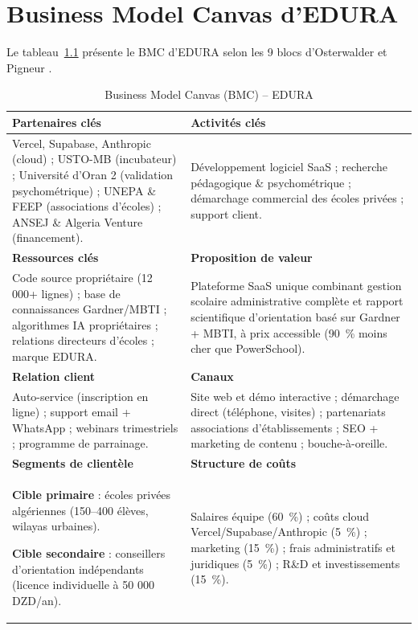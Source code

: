 \documentclass[12pt,a4paper,oneside]{report}
\begin{document}
\chapter{Business Model Canvas d'EDURA}

Le tableau~\ref{tab:bmc} présente le \ac{BMC} d'EDURA selon les 9 blocs d'Osterwalder et Pigneur \autocite{osterwalder2010business}.

\begin{table}[H]
\centering
\caption{Business Model Canvas (BMC) -- EDURA}
\label{tab:bmc}
\renewcommand{\arraystretch}{1.3}
\begin{tabularx}{\textwidth}{|X|X|}
\hline
\rowcolor{gray!20}
\textbf{Partenaires clés} & \textbf{Activités clés} \\
\hline
Vercel, Supabase, Anthropic (cloud) ; USTO-MB (incubateur) ; Université d'Oran 2 (validation psychométrique) ; UNEPA \& FEEP (associations d'écoles) ; ANSEJ \& Algeria Venture (financement).
&
Développement logiciel SaaS ; recherche pédagogique \& psychométrique ; démarchage commercial des écoles privées ; support client. \\
\hline
\rowcolor{gray!20}
\textbf{Ressources clés} & \textbf{Proposition de valeur} \\
\hline
Code source propriétaire (12 000+ lignes) ; base de connaissances Gardner/MBTI ; algorithmes IA propriétaires ; relations directeurs d'écoles ; marque EDURA.
&
Plateforme SaaS unique combinant gestion scolaire administrative complète et rapport scientifique d'orientation basé sur Gardner + MBTI, à prix accessible (90~\% moins cher que PowerSchool). \\
\hline
\rowcolor{gray!20}
\textbf{Relation client} & \textbf{Canaux} \\
\hline
Auto-service (inscription en ligne) ; support email + WhatsApp ; webinars trimestriels ; programme de parrainage.
&
Site web et démo interactive ; démarchage direct (téléphone, visites) ; partenariats associations d'établissements ; SEO + marketing de contenu ; bouche-à-oreille. \\
\hline
\rowcolor{gray!20}
\textbf{Segments de clientèle} & \textbf{Structure de coûts} \\
\hline
\textbf{Cible primaire} : écoles privées algériennes (150--400 élèves, wilayas urbaines).\par
\textbf{Cible secondaire} : conseillers d'orientation indépendants (licence individuelle à 50 000 DZD/an).
&
Salaires équipe (60~\%) ; coûts cloud Vercel/Supabase/Anthropic (5~\%) ; marketing (15~\%) ; frais administratifs et juridiques (5~\%) ; R\&D et investissements (15~\%). \\

\end{tabularx}
\end{table}
\end{document}
